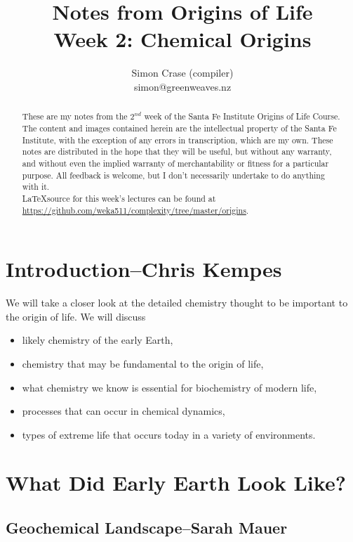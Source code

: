\documentclass[]{article}
\title{
	Notes from Origins of Life\\
	Week 2: Chemical Origins
}
\author{Simon Crase (compiler)\\simon@greenweaves.nz}
\begin{document}
\maketitle

\begin{abstract}
   These are my notes from the $2^{nd}$ week of the Santa Fe Institute Origins of Life Course\cite{sfi2020}. 
   The content and images contained herein are the intellectual property of the Santa Fe Institute, with the exception of any errors in transcription, which are my own.
   These notes are distributed in the hope that they will be useful,
   but without any warranty, and without even the implied warranty of
   merchantability or fitness for a particular purpose. All feedback is welcome,
   but I don't necessarily undertake to do anything with it.\\
   \LaTeX source for this week's lectures can be found at\\
   \url{https://github.com/weka511/complexity/tree/master/origins}.
\end{abstract}

\setcounter{tocdepth}{2}
\tableofcontents
\listoffigures

\section[Introduction]{Introduction--Chris Kempes}

We will take a closer look at the detailed chemistry thought to be important to the origin of life. We will discuss
\begin{itemize}
	\item likely chemistry of the early Earth,
	\item chemistry that may be  fundamental to the origin of life,
	\item what chemistry we know is essential for biochemistry of modern life,
	\item processes that can occur in chemical dynamics, 
	\item types of extreme life that occurs today in a variety of environments.
\end{itemize}


\section{What Did Early Earth Look Like?}

\subsection[Geochemical Landscape]{Geochemical Landscape--Sarah Mauer}
\end{document}

